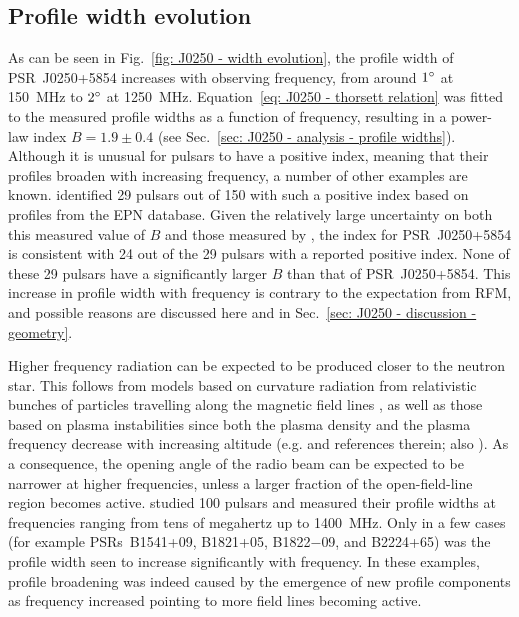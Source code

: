 \subsection{Profile width evolution}
\label{sec: J0250 - discussion - profile width} 
As can be seen in Fig.~\ref{fig: J0250 - width evolution}, the profile width of PSR~J0250+5854 increases with observing frequency, from around $1^\circ$ at 150~MHz to $2^\circ$ at 1250~MHz. Equation~\eqref{eq: J0250 - thorsett relation} was fitted to the measured profile widths as a function of frequency, resulting in a power-law index $B = 1.9\pm0.4$ (see Sec.~\ref{sec: J0250 - analysis - profile widths}). Although it is unusual for pulsars to have a positive index, meaning that their profiles broaden with increasing frequency, a number of other examples are known. \citet{CWxx2014} identified 29 pulsars out of 150 with such a positive index based on profiles from the EPN database. Given the relatively large uncertainty on both this measured value of $B$ and those measured by \citet{CWxx2014}, the index for PSR~J0250+5854 is consistent with 24 out of the 29 pulsars with a reported positive index. None of these 29 pulsars have a significantly larger $B$ than that of PSR~J0250+5854. This increase in profile width with frequency is contrary to the expectation from RFM, and possible reasons are discussed here and in Sec.~\ref{sec: J0250 - discussion - geometry}.

Higher frequency radiation can be expected to be produced closer to the neutron star. This follows from models based on curvature radiation from relativistic bunches of particles travelling along the magnetic field lines \citep[e.g.][and references therein]{GLMx2004,DRxx2015}, as well as those based on plasma instabilities since both the plasma density and the plasma frequency decrease with increasing altitude (e.g. \citealt{HAxx2001} and references therein; also \citealt{GGMx2002}). As a consequence, the opening angle of the radio beam can be expected to be narrower at higher frequencies, unless a larger fraction of the open-field-line region becomes active. \citet{PHS+2016} studied 100 pulsars and measured their profile widths at frequencies ranging from tens of megahertz up to 1400~MHz. Only in a few cases (for example PSRs~B1541+09, B1821+05, B1822$-$09, and B2224+65) was the profile width seen to increase significantly with frequency. In these examples, profile broadening was indeed caused by the emergence of new profile components as frequency increased pointing to more field lines becoming active.

